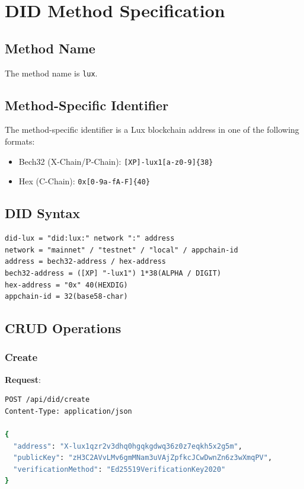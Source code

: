 \section{DID Method Specification}


\subsection{Method Name}

The method name is \texttt{lux}.

\subsection{Method-Specific Identifier}

The method-specific identifier is a Lux blockchain address in one of the following formats:

\begin{itemize}
  \item Bech32 (X-Chain/P-Chain): \texttt{[XP]-lux1[a-z0-9]\{38\}}
  \item Hex (C-Chain): \texttt{0x[0-9a-fA-F]\{40\}}
\end{itemize}

\subsection{DID Syntax}

\begin{verbatim}
did-lux = "did:lux:" network ":" address
network = "mainnet" / "testnet" / "local" / appchain-id
address = bech32-address / hex-address
bech32-address = ([XP] "-lux1") 1*38(ALPHA / DIGIT)
hex-address = "0x" 40(HEXDIG)
appchain-id = 32(base58-char)
\end{verbatim}

\subsection{CRUD Operations}

\subsubsection{Create}

\textbf{Request}:
\begin{lstlisting}[language=bash]
POST /api/did/create
Content-Type: application/json

{
  "address": "X-lux1qzr2v3dhq0hgqkgdwq36z0z7eqkh5x2g5m",
  "publicKey": "zH3C2AVvLMv6gmMNam3uVAjZpfkcJCwDwnZn6z3wXmqPV",
  "verificationMethod": "Ed25519VerificationKey2020"
}
\end{lstlisting}

